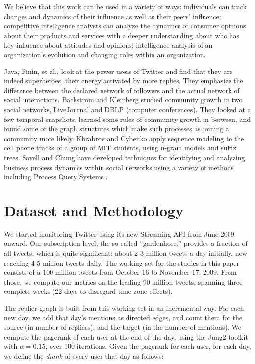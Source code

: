 \documentclass[10pt,oneside]{memoir}
\begin{document}
We believe that this work can be used in a variety of ways:  individuals can track changes and dynamics of their influence as well as their peers' influence; competitive intelligence analysts can analyze the dynamics of consumer opinions about their products and services with a deeper understanding about who has key influence about attitudes and opinions; intelligence analysis of an organization's evolution and changing roles within an organization.


Java, Finin, et al., \cite{DBLP:conf/kdd/JavaSFT07} look at the power users of Twitter and find that they are indeed superheroes, their energy activated by more replies.  They emphasize the difference between the declared network of followers and the actual network of social interactions. Backstrom and Kleinberg \cite{DBLP:conf/kdd/BackstromHKL06} studied community growth in two social networks, LiveJournal and DBLP (computer conferences).  They looked at a few temporal snapshots, learned some rules of community growth in between, and found some of the graph structures which make such processes as joining a community more likely.  Khrabrov and Cybenko \cite{DBLP:conf/cse/KhrabrovC09} apply sequence modeling to the cell phone tracks of a group of MIT students, using n-gram models and suffix trees.  Savell \cite{Savell:2008:Intelligence} and Chung \cite{Chung:2006:Tracking} have developed techniques for identifying and analyzing business process dynamics within social networks using a variety of methods including Process Query Systems \cite{PQS:2007}.


\pagebreak \section{Dataset and Methodology}
\label{datasetandmethodology}

We started monitoring Twitter using its new Streaming API from June 2009 onward.  Our subscription level, the so-called ``gardenhose,'' provides a fraction of all tweets, which is quite significant: about 2-3 million tweets a day initially, now reaching 4-5 million tweets daily.  The working set for the studies in this paper consists of a 100 million tweets from October 16 to November 17, 2009.   From those, we compute our metrics on the leading 90 million tweets, spanning three complete weeks (22 days to disregard time zone effects).


The replier graph is built from this working set in an incremental way.  For each new day, we add that day's mentions as directed edges, and count them for the source (in number of repliers), and the target (in the number of mentions).  We compute the pagerank \cite{DBLP:journals/cn/BrinP98} of each user at the end of the day, using the Jung2 toolkit \cite{code:jung} with $\alpha=0.15$, over 100 iterations. Given the pagerank for each user, for each day, we define the {\itshape drank} of every user that day as follows:
\end{document}
